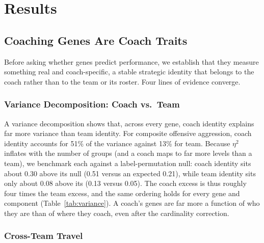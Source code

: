 \documentclass[USenglish]{article}
\theoremstyle{dgthm}
\theoremstyle{dgdef}
\begin{document}
\section{Results}

\subsection{Coaching Genes Are Coach Traits}
\label{sec:traits}

Before asking whether genes predict performance, we establish that they measure something real and coach-specific, a stable strategic identity that belongs to the coach rather than to the team or its roster. Four lines of evidence converge.

\subsubsection{Variance Decomposition: Coach vs.\ Team}

A variance decomposition shows that, across every gene, coach identity explains far more variance than team identity. For composite offensive aggression, coach identity accounts for 51\% of the variance against 13\% for team. Because $\eta^2$ inflates with the number of groups (and a coach maps to far more levels than a team), we benchmark each against a label-permutation null: coach identity sits about 0.30 above its null (0.51 versus an expected 0.21), while team identity sits only about 0.08 above its (0.13 versus 0.05). The coach excess is thus roughly four times the team excess, and the same ordering holds for every gene and component (Table~\ref{tab:variance}). A coach's genes are far more a function of who they are than of where they coach, even after the cardinality correction.

\subsubsection{Cross-Team Travel}
\end{document}

